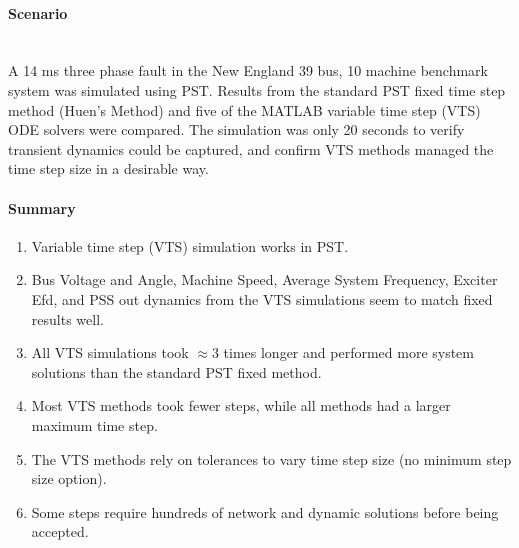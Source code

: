 \documentclass[12pt]{article}
\begin{document}
\onehalfspacing
\paragraph{Scenario} \ \\
A 14 ms three phase fault in the New England 39 bus, 10 machine benchmark system was simulated using PST.
Results from the standard PST fixed time step method (Huen's Method) and five of the MATLAB variable time step (VTS) ODE solvers were compared.
The simulation was only 20 seconds to verify transient dynamics could be captured, and confirm VTS methods managed the time step size in a desirable way.

\paragraph{Summary} 
\begin{enumerate}
\item Variable time step (VTS) simulation works in PST.
\item Bus Voltage and Angle, Machine Speed, Average System Frequency, Exciter Efd, and PSS out dynamics from the VTS simulations seem to match fixed results well.

\item All VTS simulations took $\approx$3 times longer and performed more system solutions than the standard PST fixed method.
\item Most VTS methods took fewer steps, while all methods had a larger maximum time step.
\item The VTS methods rely on tolerances to vary time step size (no minimum step size option).
\item Some steps require hundreds of network and dynamic solutions before being accepted.
\end{enumerate}
\end{document}
